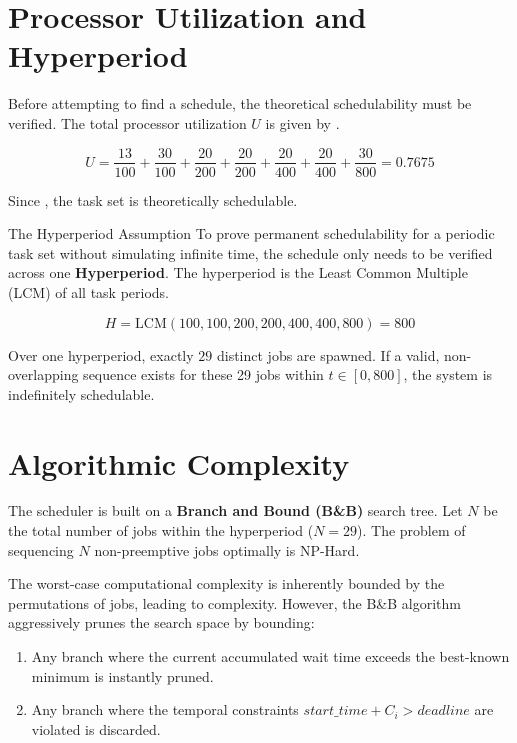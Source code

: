 \documentclass{report}
\begin{document}
\section{Processor Utilization and Hyperperiod}
Before attempting to find a schedule, the theoretical schedulability must be verified. The total processor utilization $U$ is given by .

\[
U = \frac{13}{100} + \frac{30}{100} + \frac{20}{200} + \frac{20}{200} + \frac{20}{400} + \frac{20}{400} + \frac{30}{800} = 0.7675
\]

Since , the task set is theoretically schedulable.

\begin{proposition}{The Hyperperiod Assumption}
    To prove permanent schedulability for a periodic task set without simulating infinite time, the schedule only needs to be verified across one \textbf{Hyperperiod}. The hyperperiod is the Least Common Multiple (LCM) of all task periods.

    \[
    H = \text{LCM}(100, 100, 200, 200, 400, 400, 800) = 800
    \]

    \tcblower

    Over one hyperperiod, exactly $29$ distinct jobs are spawned. If a valid, non-overlapping sequence exists for these 29 jobs within $t \in [0, 800]$, the system is indefinitely schedulable.

\end{proposition}

\section{Algorithmic Complexity}

The scheduler is built on a \textbf{Branch and Bound (B\&B)} search tree. 
Let $N$ be the total number of jobs within the hyperperiod ($N = 29$). The problem of sequencing $N$ non-preemptive jobs optimally is NP-Hard.

The worst-case computational complexity is inherently bounded by the permutations of jobs, leading to  complexity. However, the B\&B algorithm aggressively prunes the search space by bounding:

\begin{enumerate}
    \item Any branch where the current accumulated wait time exceeds the best-known minimum is instantly pruned.
    \item Any branch where the temporal constraints $start\_time + C_i > deadline$ are violated is discarded.
\end{enumerate}
\end{document}
